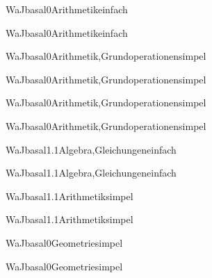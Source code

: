 \documentclass[12pt]{article}
\begin{document}
    \begin{Add}{WaJ}{basal0}{Arithmetik}{einfach}
    \solution{ }
    \end{Add}
    \begin{Add}{WaJ}{basal0}{Arithmetik}{einfach}
    \end{Add}
    

\begin{Add}{WaJ}{basal0}{Arithmetik,Grundoperationen}{simpel}
\solution{ }
\end{Add}
\begin{Add}{WaJ}{basal0}{Arithmetik,Grundoperationen}{simpel}
\end{Add}

\begin{Add}{WaJ}{basal0}{Arithmetik,Grundoperationen}{simpel}
\solution{ }
\end{Add}
\begin{Add}{WaJ}{basal0}{Arithmetik,Grundoperationen}{simpel}
\end{Add}

\begin{Add}{WaJ}{basal1.1}{Algebra,Gleichungen}{einfach}
\solution{ }
\end{Add}
\begin{Add}{WaJ}{basal1.1}{Algebra,Gleichungen}{einfach}
\end{Add}

\begin{Add}{WaJ}{basal1.1}{Arithmetik}{simpel}
\solution{ }
\end{Add}
\begin{Add}{WaJ}{basal1.1}{Arithmetik}{simpel}
\end{Add}

\begin{Add}{WaJ}{basal0}{Geometrie}{simpel}
\solution{ }
\end{Add}
\begin{Add}{WaJ}{basal0}{Geometrie}{simpel}
\end{Add}
\end{document}
